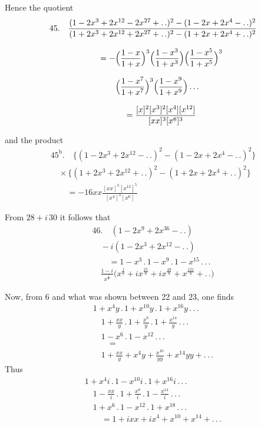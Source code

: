 Hence the quotient
\[
\begin{gathered}
45.\quad \frac{(1-2x^3+2x^{12}-2x^{27}+ .\,.)^2-(1-2x+2x^4- .\,.)^2}
{(1+2x^3+2x^{12}+2x^{27}+ .\,.)^2-(1+2x+2x^4+ .\,.)^2}\\[8pt]
\qquad=-\Bigl(\frac{1-x}{1+x}\Bigr)^3
\Bigl(\frac{1-x^3}{1+x^3}\Bigr)
\Bigl(\frac{1-x^5}{1+x^5}\Bigr)^3
\\[8pt]\quad{}\Bigl(\frac{1-x^7}{1+x^7}\Bigr)^3
\Bigl(\frac{1-x^9}{1+x^9}\Bigr)\,.\,.\,.\\[8pt]
\qquad=\frac{[x]^2[x^3]^2[x^4][x^{12}]}{[xx]^3[x^6]^3}
\end{gathered}
\]

and the product
\[
\begin{gathered}
45^{\mathrm b}.\quad \bigl\{(1-2x^3+2x^{12}- .\,.)^2-(1-2x+2x^4- .\,.)^2\bigr\}\\[8pt]
\quad\times\bigl\{(1+2x^3+2x^{12}+ .\,.)^2-(1+2x+2x^4+ .\,.)^2\bigr\}\\[8pt]
\qquad=-16xx\frac{[xx]^3[x^{12}]^5}{[x^4]^3[x^6]}
\end{gathered}
\]

From $28+i\,30$ it follows that
\[
\begin{gathered}
46.\quad (1-2x^9+2x^{36}- .\,.)\\[8pt]\quad{}-i(1-2x^3+2x^{12}- .\,.)\\[8pt]
\qquad=1-x^3\,.\,1-x^9\,.\,1-x^{15}\,.\,.\,.\,
\\[8pt]\quad{}\frac{1-i}{x^{\frac18}}\bigl(x^{\frac18}+ix^{\frac{25}{8}}+ix^{\frac{49}{8}}+x^{\frac{121}{8}}+ .\,.\bigr)
\end{gathered}
\]

Now, from 6 and what was shown between 22 and 23, one finds
\[
\begin{gathered}
1+x^4y\,.\,1+x^{10}y\,.\,1+x^{16}y\,.\,.\,.\,
\\[8pt]\quad{}1+\frac{xx}{y}\,.\,1+\frac{x^8}{y}\,.\,1+\frac{x^{14}}{y}\,.\,.\,.\,\\[8pt]\quad{}
1-x^6\,.\,1-x^{12}\,.\,.\,.\\[8pt]
\qquad=\\[8pt]\quad{}1+\frac{xx}{y}+x^4y+\frac{x^{10}}{yy}+x^{14}yy+ .\,.\,.
\end{gathered}
\]
Thus
\[
\begin{gathered}
1+x^4i\,.\,1-x^{10}i\,.\,1+x^{16}i\,.\,.\,.\,
\\[8pt]\quad{}1-\frac{xx}{i}\,.\,1+\frac{x^8}{i}\,.\,1-\frac{x^{14}}{i}\,.\,.\,.\,\\[8pt]\quad{}
1+x^6\,.\,1-x^{12}\,.\,1+x^{18}\,.\,.\,.\\[8pt]
\qquad=1+ixx+ix^4+x^{10}+x^{14}+ .\,.\,.
\end{gathered}
\]

